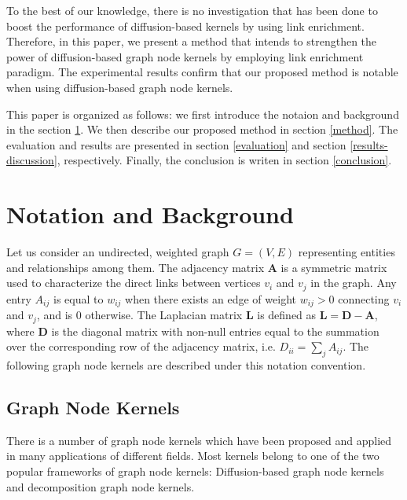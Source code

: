 \documentclass{article}
\begin{document}
To the best of our knowledge, there is no investigation that has been done to boost the performance of diffusion-based kernels by using link enrichment. Therefore, in this paper, we present a method that intends to strengthen the power of diffusion-based graph node kernels by employing link enrichment paradigm. The experimental results confirm that our proposed method is notable when using diffusion-based graph node kernels.

This paper is organized as follows: we first introduce the notaion and background in the section \ref{background}. We then describe our proposed method in section \ref{method}. The evaluation and results are presented in section \ref{evaluation} and section \ref{results-discussion}, respectively. Finally, the conclusion is writen in section \ref{conclusion}.

\section{Notation and Background}
\label{background}
Let us consider an undirected, weighted graph $G = (V, E)$ representing entities and relationships among them. The adjacency matrix $\textbf{A}$ is a symmetric matrix used to characterize the direct links between vertices $v_{i}$ and $v_{j}$ in the graph. Any entry $A_{ij}$ is equal to $w_{ij}$ when there exists an edge of weight $w_{ij}>0$ connecting $v_{i}$ and $v_{j}$, and is 0 otherwise. The Laplacian matrix $\textbf{L}$ is defined as $\textbf{L} = \textbf{D}-\textbf{A}$, where $\textbf{D}$ is the diagonal matrix with non-null entries equal to the summation over the corresponding row of the adjacency matrix, i.e. $D_{ii}=\sum_j A_{ij}$. The following graph node kernels are described under this notation convention. 
\subsection{Graph Node Kernels}
There is a number of graph node kernels which have been proposed and applied in many applications of different fields. Most kernels belong to one of the two popular frameworks of graph node kernels: Diffusion-based graph node kernels and decomposition graph node kernels. 
\end{document}

